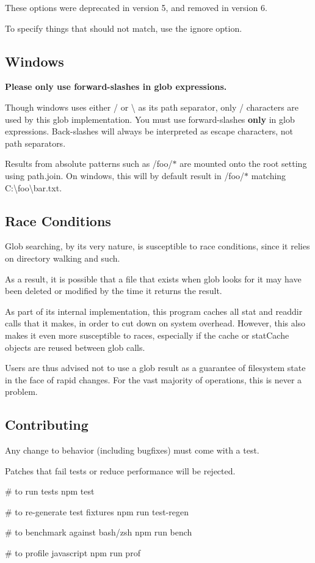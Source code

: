 These options were deprecated in version 5, and removed in version 6.

To specify things that should not match, use the {\ttfamily ignore} option.

\subsection*{Windows}

{\bfseries Please only use forward-\/slashes in glob expressions.}

Though windows uses either {\ttfamily /} or {\ttfamily \textbackslash{}} as its path separator, only {\ttfamily /} characters are used by this glob implementation. You must use forward-\/slashes {\bfseries only} in glob expressions. Back-\/slashes will always be interpreted as escape characters, not path separators.

Results from absolute patterns such as {\ttfamily /foo/$\ast$} are mounted onto the root setting using {\ttfamily path.\+join}. On windows, this will by default result in {\ttfamily /foo/$\ast$} matching {\ttfamily C\+:\textbackslash{}foo\textbackslash{}bar.\+txt}.

\subsection*{Race Conditions}

Glob searching, by its very nature, is susceptible to race conditions, since it relies on directory walking and such.

As a result, it is possible that a file that exists when glob looks for it may have been deleted or modified by the time it returns the result.

As part of its internal implementation, this program caches all stat and readdir calls that it makes, in order to cut down on system overhead. However, this also makes it even more susceptible to races, especially if the cache or stat\+Cache objects are reused between glob calls.

Users are thus advised not to use a glob result as a guarantee of filesystem state in the face of rapid changes. For the vast majority of operations, this is never a problem.

\subsection*{Contributing}

Any change to behavior (including bugfixes) must come with a test.

Patches that fail tests or reduce performance will be rejected.


\begin{DoxyCode}
# to run tests
npm test

# to re-generate test fixtures
npm run test-regen

# to benchmark against bash/zsh
npm run bench

# to profile javascript
npm run prof
\end{DoxyCode}
 